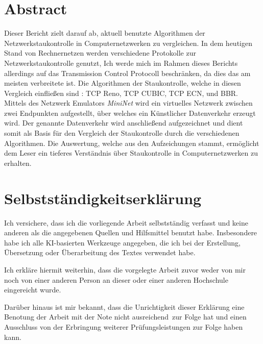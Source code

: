 \documentclass[paper=a4,fontsize=12pt,ngerman]{scrartcl}
\begin{document}
\pagestyle{plain}



\section*{Abstract}



Dieser Bericht zielt darauf ab, aktuell benutzte Algorithmen der Netzwerkstaukontrolle in Computernetzwerken zu vergleichen.
In dem heutigen Stand von Rechnernetzen werden verschiedene Protokolle zur Netzwerkstaukontrolle genutzt, 
Ich werde mich im Rahmen dieses Berichts allerdings auf das Transmission Control Protocoll beschränken, da dies das am meisten verbreitete ist.  \newline
Die Algorithmen der Staukontrolle, welche in diesen Vergleich einfließen sind : TCP Reno, TCP CUBIC, TCP ECN, und BBR.
\newline
Mittels des Netzwerk Emulators \textit{MiniNet} wird ein virtuelles Netzwerk zwischen zwei Endpunkten aufgestellt, über
welches ein Künstlicher Datenverkehr erzeugt wird.
Der genannte Datenverkehr wird anschließend aufgezeichnet und dient somit als Basis für den Vergleich der Staukontrolle durch 
die verschiedenen Algorithmen.
Die Auswertung, welche aus den Aufzeichungen stammt, ermöglicht dem Leser ein tieferes Verständnis über Staukontrolle in Computernetzwerken
zu erhalten. 




\newpage
\section*{Selbstständigkeitserklärung}
Ich versichere, dass ich die vorliegende Arbeit selbstständig verfasst und 
keine anderen als die angegebenen Quellen und Hilfsmittel benutzt habe.
Insbesondere habe ich alle KI-basierten Werkzeuge angegeben, die ich bei
der Erstellung, Übersetzung oder Überarbeitung des Textes verwendet habe.

Ich erkläre hiermit weiterhin, dass die vorgelegte Arbeit zuvor weder von mir 
noch von einer anderen Person an dieser oder einer anderen Hochschule 
eingereicht wurde.

Darüber hinaus ist mir bekannt, dass die Unrichtigkeit dieser Erklärung eine 
Benotung der Arbeit mit der Note \glqq nicht ausreichend\grqq \ zur Folge hat 
und einen Ausschluss von der Erbringung weiterer Prüfungsleistungen zur Folge 
haben kann.
\bigskip
 
\end{document}
